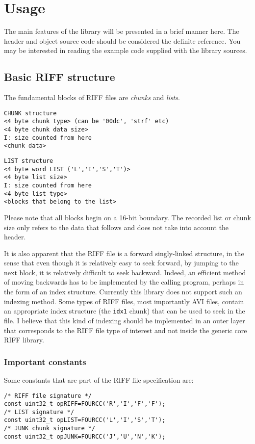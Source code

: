 \documentclass[12pt, a4paper]{article}
\begin{document}
\section{Usage}
 The main features of the library will be presented in a brief manner here. The
header and object source code should be considered the definite reference. 
You may be interested in reading the example code supplied with the library
sources.

\subsection{Basic RIFF structure}
 The fundamental blocks of RIFF files are \emph{chunks} and \emph{lists}.

\begin{verbatim}
CHUNK structure
<4 byte chunk type> (can be '00dc', 'strf' etc)
<4 byte chunk data size>
I: size counted from here
<chunk data>
\end{verbatim}

\begin{verbatim}
LIST structure
<4 byte word LIST ('L','I','S','T')> 
<4 byte list size>
I: size counted from here
<4 byte list type>
<blocks that belong to the list>
\end{verbatim}

Please note that all blocks begin on a 16-bit boundary. The recorded list or
chunk size only refers to the data that follows and does not take into 
account the header.

It is also apparent that the RIFF file is a forward singly-linked structure,
in the sense that even though it is relatively easy to seek forward, by jumping
to the next block, it is relatively difficult to seek backward. Indeed, an
efficient method of moving backwards has to be implemented by the calling 
program, perhaps in the form of an index structure. Currently this library
does not support such an indexing method. Some types of RIFF files, most
importantly AVI files, contain an appropriate index structure (the \verb+idx1+
chunk) that can be used to seek in the file. I believe that this kind
of indexing should be implemented in an outer layer that corresponds to the
RIFF file type of interest and not inside the generic core RIFF library.

\subsubsection{Important constants}
Some constants that are part of the RIFF file specification are:
\begin{verbatim}
/* RIFF file signature */
const uint32_t opRIFF=FOURCC('R','I','F','F'); 
/* LIST signature */
const uint32_t opLIST=FOURCC('L','I','S','T');
/* JUNK chunk signature */
const uint32_t opJUNK=FOURCC('J','U','N','K');
\end{verbatim}
\end{document}
